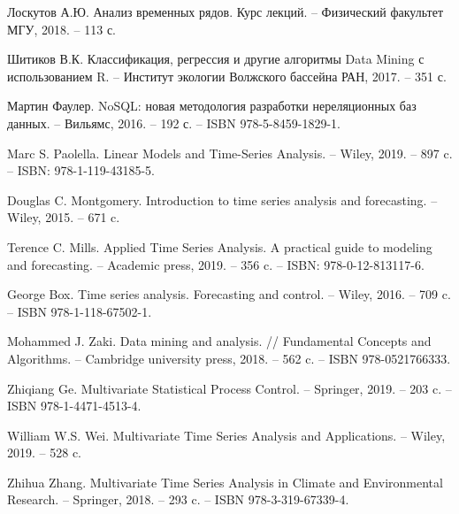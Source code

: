 \begingroup 
\renewcommand{\section}[2]{\anonsection{Список литературы}}
\begin{thebibliography}{00}

    Лоскутов А.Ю.
    Анализ временных рядов.
    Курс лекций.
    -- Физический факультет МГУ, 2018. -- 113 с.

    Шитиков В.К.
    Классификация, регрессия и другие алгоритмы Data Mining
    с использованием R.
    -- Институт экологии Волжского бассейна РАН, 2017. -- 351 с.

    Мартин Фаулер.
    NoSQL: новая методология разработки нереляционных баз данных.
    -- Вильямс, 2016. -- 192 с.
    -- ISBN 978-5-8459-1829-1.

    Marc S. Paolella.
    Linear Models and Time-Series Analysis.
    -- Wiley, 2019. -- 897 c.
    -- ISBN: 978-1-119-43185-5.

    Douglas C. Montgomery.
    Introduction to time series analysis and forecasting.
    -- Wiley, 2015. -- 671 c.

    Terence C. Mills.
    Applied Time Series Analysis.
    A practical guide to modeling and forecasting.
    -- Academic press, 2019. -- 356 c.
    -- ISBN: 978-0-12-813117-6.

    George Box.
    Time series analysis.
    Forecasting and control.
    -- Wiley, 2016. -- 709 c.
    -- ISBN 978-1-118-67502-1.

    Mohammed J. Zaki.
    Data mining and analysis. //
    Fundamental Concepts and Algorithms.
    -- Cambridge university press, 2018. -- 562 c.
    -- ISBN 978-0521766333.

    Zhiqiang Ge.
    Multivariate Statistical Process Control.
    -- Springer, 2019. -- 203 c.
    -- ISBN 978-1-4471-4513-4.

    William W.S. Wei.
    Multivariate Time Series Analysis and Applications.
    -- Wiley, 2019. -- 528 c.

    Zhihua Zhang.
    Multivariate Time Series Analysis in Climate
    and Environmental Research.
    -- Springer, 2018. -- 293 c.
    -- ISBN 978-3-319-67339-4.


\end{thebibliography}
